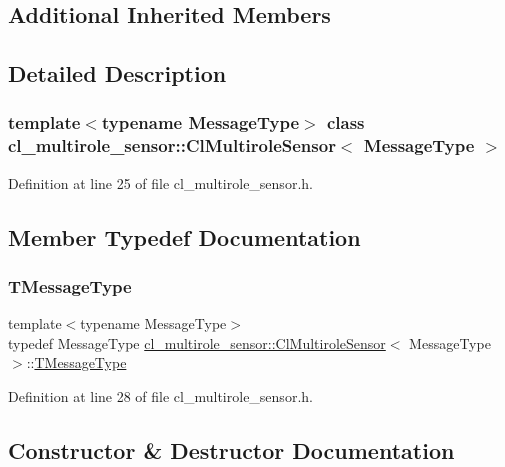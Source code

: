 \subsection*{Additional Inherited Members}


\subsection{Detailed Description}
\subsubsection*{template$<$typename Message\+Type$>$\newline
class cl\+\_\+multirole\+\_\+sensor\+::\+Cl\+Multirole\+Sensor$<$ Message\+Type $>$}



Definition at line 25 of file cl\+\_\+multirole\+\_\+sensor.\+h.



\subsection{Member Typedef Documentation}
\mbox{\label{classcl__multirole__sensor_1_1ClMultiroleSensor_a76f2c1e5c54556bacdaf0aaf809972da}} 
\subsubsection{\texorpdfstring{T\+Message\+Type}{TMessageType}}
{\footnotesize\ttfamily template$<$typename Message\+Type$>$ \\
typedef Message\+Type \hyperlink{classcl__multirole__sensor_1_1ClMultiroleSensor}{cl\+\_\+multirole\+\_\+sensor\+::\+Cl\+Multirole\+Sensor}$<$ Message\+Type $>$\+::\hyperlink{classsmacc_1_1client__bases_1_1SmaccSubscriberClient_a61d798bda71bf335d72e61928ca561b0}{T\+Message\+Type}}



Definition at line 28 of file cl\+\_\+multirole\+\_\+sensor.\+h.



\subsection{Constructor \& Destructor Documentation}
\mbox{\label{classcl__multirole__sensor_1_1ClMultiroleSensor_a25fcca3996fb5cbd5aa46cae4170e75e}} 
